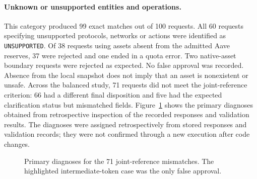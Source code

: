\paragraph{Unknown or unsupported entities and operations.}
This category produced 99 exact matches out of 100 requests. All 60 requests
specifying unsupported protocols, networks or actions were identified as
\texttt{UNSUPPORTED}. Of 38 requests using assets absent from the admitted
Aave reserves, 37 were rejected and one ended in a quota error. Two
native-asset boundary requests were rejected as expected. No false
approval was recorded. Absence from the local snapshot does not imply
that an asset is nonexistent or unsafe. Across the balanced study, 71 requests did not meet the joint-reference
criterion: 66 had a different final disposition and five had the expected
clarification status but mismatched fields. Figure~\ref{fig:results_errors}
shows the primary diagnoses obtained from retrospective inspection of the
recorded responses and validation results. The diagnoses were assigned retrospectively from stored responses and validation
records; they were not confirmed through a new execution after code changes.

\begin{figure}[H]
\centering
{}
\caption{Primary diagnoses for the 71 joint-reference mismatches. The highlighted intermediate-token case was the only false approval.}
\label{fig:results_errors}
\end{figure}

